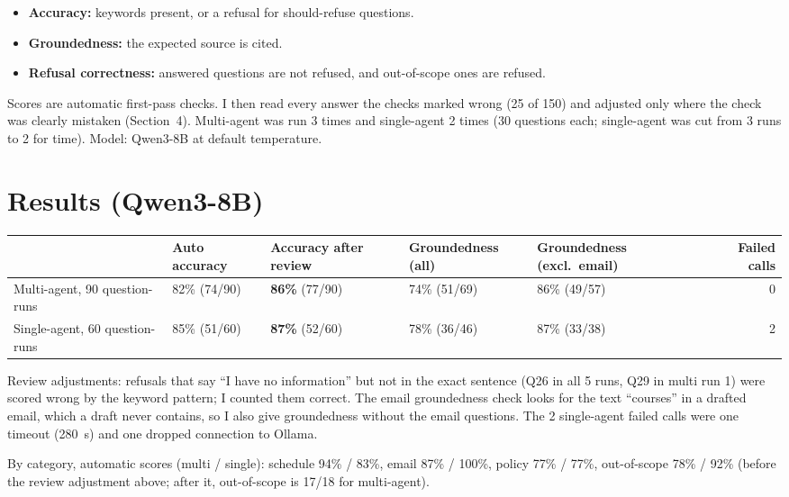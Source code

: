 \documentclass[10pt,a4paper]{article}
\begin{document}
\begin{itemize}
\item \textbf{Accuracy:} keywords present, or a refusal for should-refuse questions.
\item \textbf{Groundedness:} the expected source is cited.
\item \textbf{Refusal correctness:} answered questions are not refused, and out-of-scope ones are refused.
\end{itemize}

Scores are automatic first-pass checks. I then read every answer the checks marked wrong (25 of 150) and adjusted only where the check was clearly mistaken (Section~4). Multi-agent was run 3 times and single-agent 2 times (30 questions each; single-agent was cut from 3 runs to 2 for time). Model: Qwen3-8B at default temperature.

\section{Results (Qwen3-8B)}

\begin{center}\small
\begin{tabularx}{\linewidth}{@{}lXXXXr@{}}
\toprule
 & Auto accuracy & Accuracy after review & Groundedness (all) & Groundedness (excl.\ email) & Failed calls\\
\midrule
Multi-agent, 90 question-runs & 82\% (74/90) & \textbf{86\%} (77/90) & 74\% (51/69) & 86\% (49/57) & 0\\
Single-agent, 60 question-runs & 85\% (51/60) & \textbf{87\%} (52/60) & 78\% (36/46) & 87\% (33/38) & 2\\
\bottomrule
\end{tabularx}
\end{center}

Review adjustments: refusals that say ``I have no information'' but not in the exact sentence (Q26 in all 5 runs, Q29 in multi run 1) were scored wrong by the keyword pattern; I counted them correct. The email groundedness check looks for the text ``courses'' in a drafted email, which a draft never contains, so I also give groundedness without the email questions. The 2 single-agent failed calls were one timeout (280~s) and one dropped connection to Ollama.

By category, automatic scores (multi / single): schedule 94\% / 83\%, email 87\% / 100\%, policy 77\% / 77\%, out-of-scope 78\% / 92\% (before the review adjustment above; after it, out-of-scope is 17/18 for multi-agent).
\end{document}
